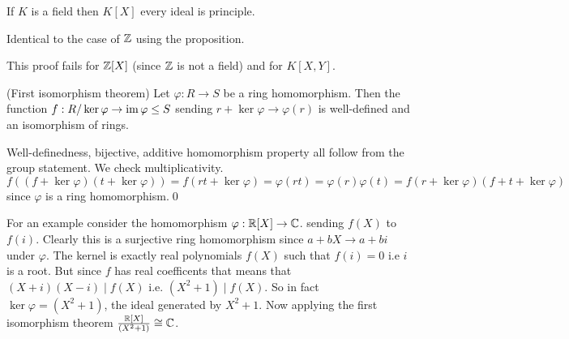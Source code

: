 \documentclass{article}
\begin{document}
\begin{corollary}
	If $ K $ is a field then $ K[X] $ every ideal is principle.
\end{corollary}
\pf Identical to the case of $ \mathbb{Z} $ using the proposition.\par
This proof fails for $ \mathbb{Z} [X] $ (since $ \mathbb{Z} $ is not a field) and for $ K[X,Y] $.
\begin{theorem}
	(First isomorphism theorem) Let $ \varphi:R\to S $ be a ring homomorphism. Then the function $ f:R/\ker\varphi\to\operatorname{im}\varphi\le S $ sending $ r+\ker\varphi\to\varphi(r) $ is well-defined and an isomorphism of rings.
\end{theorem}
\pf Well-definedness, bijective, additive homomorphism property all follow from the group statement. We check multiplicativity. $ f((f+\ker\varphi)(t+\ker\varphi))=f(rt+\ker\varphi)=\varphi(rt)=\varphi(r)\varphi(t)=f(r+\ker\varphi)(f+t+\ker\varphi) $ since $ \varphi $ is a ring homomorphism.\qed
\par
For an example consider the homomorphism $ \varphi:\mathbb{R}[X]\to \mathbb{C} $. sending $ f(X) $ to $ f(i) $. Clearly this is a surjective ring homomorphism since $ a+bX\to a+bi $ under $ \varphi $. The kernel is exactly real polynomials $ f(X) $ such that $ f(i)=0 $ i.e $ i $ is a root. But since $ f $ has real coefficents that means that $ (X+i)(X-i)\mid f(X) $ i.e. $ (X^2+1)\mid f(X) $. So in fact $ \ker\varphi=(X^2+1) $, the ideal generated by $ X^2+1 $. Now applying the first isomorphism theorem $ \frac{\mathbb{R}[X]}{(X^2+1)}\cong \mathbb{C} $.
\end{document}
